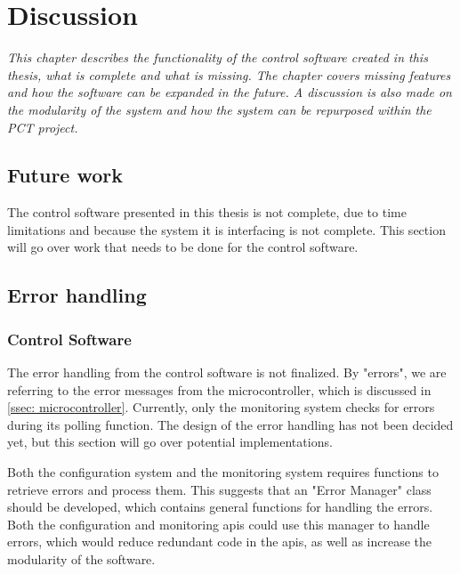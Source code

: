 \documentclass[main.tex]{subfiles}
\begin{document}

\section{Discussion}
\textit{This chapter describes the functionality of the control software created in this thesis, what is complete and what is missing. The chapter covers missing features and how the software can be expanded in the future. A discussion is also made on the modularity of the system and how the system can be repurposed within the PCT project.}

\subsection{Future work}

The control software presented in this thesis is not complete, due to time limitations and because the system it is interfacing is not complete. This section will go over work that needs to be done for the control software.


\subsection{Error handling}

\subsubsection{Control Software}

The error handling from the control software is not finalized. By "errors", we are referring to the error messages from the microcontroller, which is discussed in \autoref{ssec: microcontroller}. Currently, only the monitoring system checks for errors during its polling function. The design of the error handling has not been decided yet, but this section will go over potential implementations.

Both the configuration system and the monitoring system requires functions to retrieve errors and process them. This suggests that an "Error Manager" class should be developed, which contains general functions for handling the errors. Both the configuration and monitoring \gls{api}s could use this manager to handle errors, which would reduce redundant code in the \gls{api}s, as well as increase the modularity of the software.
\end{document}
